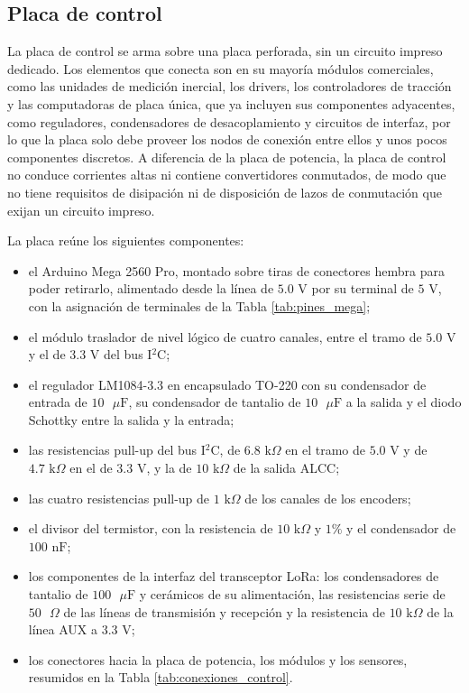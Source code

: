 \documentclass[../../General.tex]{subfiles}
\begin{document}
\subsection{Placa de control}

La placa de control se arma sobre una placa perforada, sin un circuito impreso dedicado. Los elementos que conecta son en su mayoría módulos comerciales, como las unidades de medición inercial, los drivers, los controladores de tracción y las computadoras de placa única, que ya incluyen sus componentes adyacentes, como reguladores, condensadores de desacoplamiento y circuitos de interfaz, por lo que la placa solo debe proveer los nodos de conexión entre ellos y unos pocos componentes discretos. A diferencia de la placa de potencia, la placa de control no conduce corrientes altas ni contiene convertidores conmutados, de modo que no tiene requisitos de disipación ni de disposición de lazos de conmutación que exijan un circuito impreso.

La placa reúne los siguientes componentes:
\begin{itemize}
    \item el Arduino Mega 2560 Pro, montado sobre tiras de conectores hembra para poder retirarlo, alimentado desde la línea de $5.0\text{ V}$ por su terminal de $5\text{ V}$, con la asignación de terminales de la Tabla \ref{tab:pines_mega};
    \item el módulo traslador de nivel lógico de cuatro canales, entre el tramo de $5.0\text{ V}$ y el de $3.3\text{ V}$ del bus I$^2$C;
    \item el regulador LM1084-3.3 en encapsulado TO-220 con su condensador de entrada de $10\text{ }\mu\text{F}$, su condensador de tantalio de $10\text{ }\mu\text{F}$ a la salida y el diodo Schottky entre la salida y la entrada;
    \item las resistencias pull-up del bus I$^2$C, de $6.8\text{ k}\Omega$ en el tramo de $5.0\text{ V}$ y de $4.7\text{ k}\Omega$ en el de $3.3\text{ V}$, y la de $10\text{ k}\Omega$ de la salida ALCC;
    \item las cuatro resistencias pull-up de $1\text{ k}\Omega$ de los canales de los encoders;
    \item el divisor del termistor, con la resistencia de $10\text{ k}\Omega$ y $1\%$ y el condensador de $100\text{ nF}$;
    \item los componentes de la interfaz del transceptor LoRa: los condensadores de tantalio de $100\text{ }\mu\text{F}$ y cerámicos de su alimentación, las resistencias serie de $50\text{ }\Omega$ de las líneas de transmisión y recepción y la resistencia de $10\text{ k}\Omega$ de la línea AUX a $3.3\text{ V}$;
    \item los conectores hacia la placa de potencia, los módulos y los sensores, resumidos en la Tabla \ref{tab:conexiones_control}.
\end{itemize}
\end{document}
